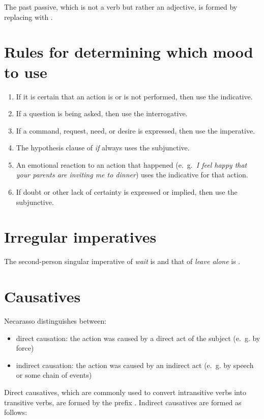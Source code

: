 \documentclass{book}
\begin{document}
The past passive, which is not a verb but rather an adjective, is formed by replacing  with .

\section{Rules for determining which mood to use}

\begin{enumerate}
  \item If it is certain that an action is or is not performed, then use the indicative.
  \item If a question is being asked, then use the interrogative.
  \item If a command, request, need, or desire is expressed, then use the imperative.
  \item The hypothesis clause of  \emph{if} always uses the subjunctive.
  \item An emotional reaction to an action that happened (e.~g.~\emph{I feel happy that your parents are inviting me to dinner}) uses the indicative for that action.
  \item If doubt or other lack of certainty is expressed or implied, then use the subjunctive.
\end{enumerate}

\section{Irregular imperatives}

The second-person singular imperative of  \emph{wait} is  and that of  \emph{leave alone} is .

\section{Causatives}

Necarasso distinguishes between:

\begin{itemize}
  \item direct causation: the action was caused by a direct act of the subject (e.~g. by force)
  \item indirect causation: the action was caused by an indirect act (e.~g. by speech or some chain of events)
\end{itemize}

Direct causatives, which are commonly used to convert intransitive verbs into transitive verbs, are formed by the prefix . Indirect causatives are formed as follows:
\end{document}

